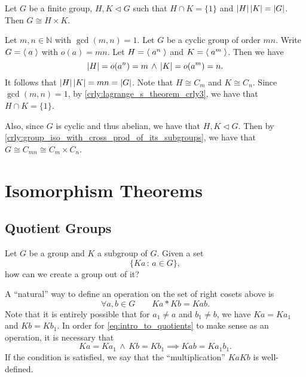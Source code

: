 \begin{crly}
\label{crly:group_iso_with_cross_prod_of_its_subgroups}
  Let $G$ be a finite group, $H, K \triangleleft G$ such that $H \cap K = \{1\}$ and $\left|H\right| \left|K\right| = \left|G\right|$. Then $G \cong H \times K$.
\end{crly}

\begin{eg}
  Let $m, n \in \mathbb{N}$ with $\gcd(m ,n) = 1$. Let $G$ be a cyclic group of order $mn$. Write $G = \langle \; a \; \rangle$ with $o(a) = mn$. Let $H = \langle \; a^n \; \rangle$ and $K = \langle \; a^m \; \rangle$. Then we have
  \begin{equation*}
    \left|H\right| = o(a^n) = m \, \land \, \left|K\right| = o(a^m) = n.
  \end{equation*}
  It follows that $\left|H\right|\left|K\right| = mn = \left|G\right|$. Note that $H \cong C_m$ and $K \cong C_n$. Since $\gcd(m, n) = 1$, by \cref{crly:lagrange_s_theorem_crly3}, we have that $H \cap K = \{1\}$.

  Also, since $G$ is cyclic and thus abelian, we have that $H, K \triangleleft G$. Then by \cref{crly:group_iso_with_cross_prod_of_its_subgroups}, we have that $G \cong C_{mn} \cong C_m \times C_n$.
\end{eg}



\section{Isomorphism Theorems}%
\label{sec:isomorphism_theorems}

\subsection{Quotient Groups}%
\label{sub:quotient_groups}

Let $G$ be a group and $K$ a subgroup of $G$. Given a set
\begin{equation*}
  \{Ka \, : \, a \in G \},
\end{equation*}
how can we create a group out of it?

A ``natural'' way to define an operation on the set of right cosets above is
\begin{equation}\tag{$\dagger$}\label{eq:intro_to_quotients}
  \forall a, b \in G \qquad Ka * Kb = Kab.
\end{equation}
Note that it is entirely possible that for $a_1 \neq a$ and $b_1 \neq b$, we have $Ka = Ka_1$ and $Kb = Kb_1$. In order for \cref{eq:intro_to_quotients} to make sense as an operation, it is necessary that
\begin{equation*}
  Ka = Ka_1 \, \land \, Kb = Kb_1 \implies Kab = Ka_1 b_1.
\end{equation*}
If the condition is satisfied, we say that the ``multiplication'' $KaKb$ is well-defined.

